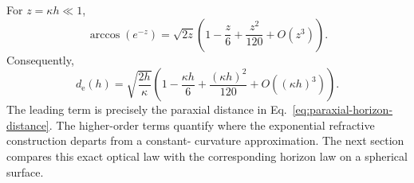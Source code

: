 For $z=\kappa h\ll 1$,
\begin{equation}
    \arccos\!\left(e^{-z}\right)
    =
    \sqrt{2z}
    \left(
        1
        -\frac{z}{6}
        +\frac{z^2}{120}
        +O(z^3)
    \right).
    \label{eq:arccos-exponential-expansion}
\end{equation}
Consequently,
\begin{equation}
    d_{\mathrm{e}}(h)
    =
    \sqrt{\frac{2h}{\kappa}}
    \left(
        1
        -\frac{\kappa h}{6}
        +\frac{(\kappa h)^2}{120}
        +O\!\left((\kappa h)^3\right)
    \right).
    \label{eq:exact-distance-expansion}
\end{equation}
The leading term is precisely the paraxial distance in
Eq.~\eqref{eq:paraxial-horizon-distance}. The higher-order terms quantify
where the exponential refractive construction departs from a constant-
curvature approximation. The next section compares this exact optical law
with the corresponding horizon law on a spherical surface.

